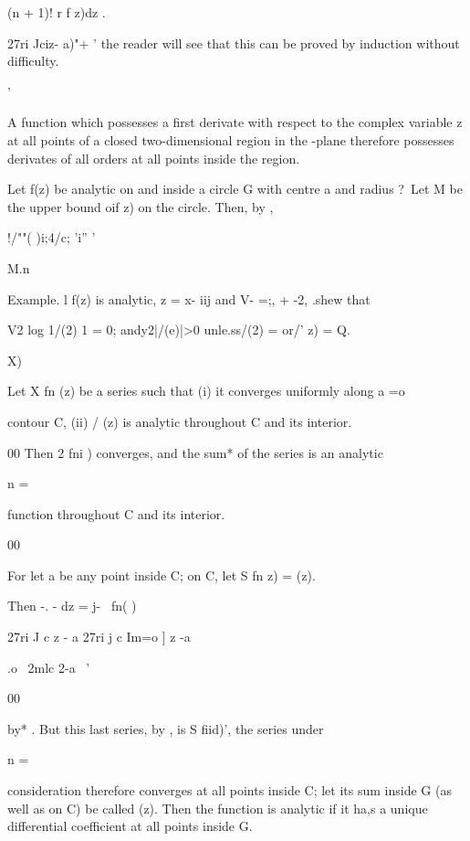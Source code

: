 {{(n + 1)! r f z)dz .

27ri Jciz- a)"+ ' the reader will see that this can be proved by
induction without difficulty.

 '

%
%

A function which possesses a first derivate with respect to the
complex variable z at all points of a closed two-dimensional region in
the -plane therefore possesses derivates of all orders at all points
inside the region.


Let f(z) be analytic on and inside a circle G with centre a and radius
?\ Let M be the upper bound oif z) on the circle. Then, by ,

!/""( )i;4/c; 'i'' '

M.n\

Example. l f(z) is analytic, z = x- iij and V- =;, + -2, .shew that

V2 log 1/(2) 1 = 0; andy2|/(e)|>0 unle.ss/(2) = or/' z) = Q.


 X)

Let X fn (z) be a series such that (i) it converges uniformly along a
=o

contour C, (ii) / (z) is analytic throughout C and its interior.

00 Then 2 fni ) converges, and the sum* of the series is an analytic

n =

function throughout C and its interior.

00

For let a be any point inside C; on C, let S fn z) = (z).

Then -. - dz = j- \ fn( )\

27ri J c z - a 27ri j c Im=o ] z -a

 .o \ 2mlc 2-a \ '

00

by* . But this last series, by , is S fiid)', the series
under

n =

consideration therefore converges at all points inside C; let its sum
inside G (as well as on C) be called (z). Then the function is
analytic if it ha,s a unique differential coefficient at all points
inside G.

}}
